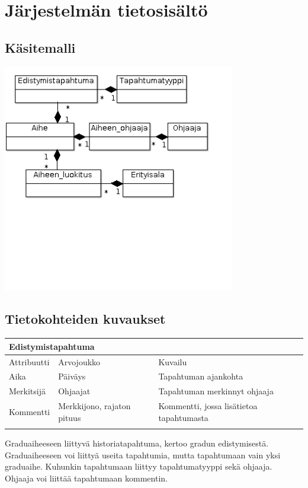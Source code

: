 \documentclass[11pt,a4paper,finnish,oneside]{article}
\begin{document}
\section{Järjestelmän tietosisältö}
\subsection{Käsitemalli}
\begin{center}
\includegraphics [width=4in]{infoContent1.png}
\end{center}
\subsection{Tietokohteiden kuvaukset}
    \begin{tabular}{ | p{3cm} | p{3cm} | p{6cm} |}
    \multicolumn{3}{l}{\textbf{Edistymistapahtuma}} \\ \hline
    {\small Attribuutti} & {\small Arvojoukko} & {\small Kuvailu}\\ \hline
    Aika & Päiväys & Tapahtuman ajankohta\\ \hline
    Merkitsijä & Ohjaajat & Tapahtuman merkinnyt ohjaaja \\ \hline
    Kommentti & Merkkijono, rajaton pituus & Kommentti, jossa lisätietoa tapahtumasta \\\hline
    \multicolumn{3}{l}{} \\

    \end{tabular}
Graduaiheeseen liittyvä historiatapahtuma, kertoo gradun edistymisestä. Graduaiheeseen voi liittyä useita tapahtumia, mutta tapahtumaan vain yksi graduaihe. Kuhunkin tapahtumaan liittyy tapahtumatyyppi sekä ohjaaja. Ohjaaja voi liittää tapahtumaan kommentin.
\end{document}
